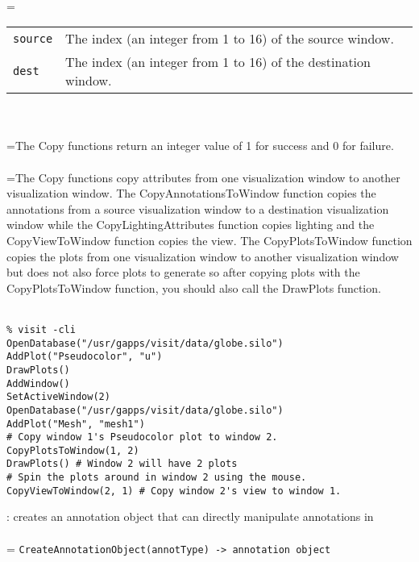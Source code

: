 \documentclass[10pt,a4paper]{report}
\begin{document}
 \\ 
\hangindent=\parindent 
\begin{tabular}{lp{9cm}}
\verb!source! & The index (an integer from 1 to 16) of the source window. \\
\verb!dest! & The index (an integer from 1 to 16) of the destination window. \\
\end{tabular} \\[-2mm]


 \\ 
\hangindent=\parindent The Copy functions return an integer value of 1 for success and 0 for failure. \\[-3mm] 

 \\ 
\hangindent=\parindent The Copy functions copy attributes from one visualization window to another visualization window. The CopyAnnotationsToWindow function copies the annotations from a source visualization window to a destination visualization window while the CopyLightingAttributes function copies lighting and the CopyViewToWindow function copies the view. The CopyPlotsToWindow function copies the plots from one visualization window to another visualization window but does not also force plots to generate so after copying plots with the CopyPlotsToWindow function, you should also call the DrawPlots function. \\[-3mm] 

\\[-6mm]
\begin{verbatim}% visit -cli
OpenDatabase("/usr/gapps/visit/data/globe.silo")
AddPlot("Pseudocolor", "u")
DrawPlots()
AddWindow()
SetActiveWindow(2)
OpenDatabase("/usr/gapps/visit/data/globe.silo")
AddPlot("Mesh", "mesh1")
# Copy window 1's Pseudocolor plot to window 2.
CopyPlotsToWindow(1, 2) 
DrawPlots() # Window 2 will have 2 plots
# Spin the plots around in window 2 using the mouse.
CopyViewToWindow(2, 1) # Copy window 2's view to window 1.
\end{verbatim}
\newpage


{}
: creates an annotation object that can directly manipulate annotations in\\[-3mm]

 \\ 
\hangindent=\parindent 
\verb!CreateAnnotationObject(annotType) -> annotation object!\\ [-3mm]
\end{document}
